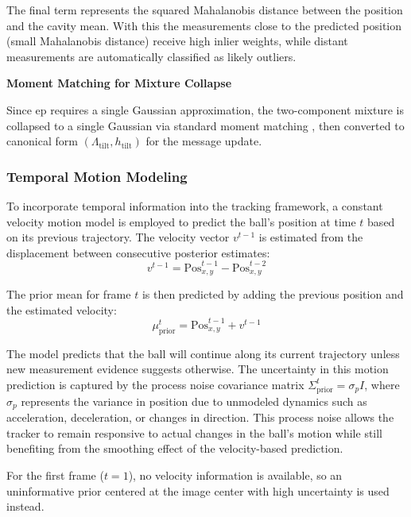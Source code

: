 \documentclass[12pt,a4paper]{article}
\begin{document}
The final term represents the squared Mahalanobis distance between the position and the cavity mean. With this the measurements close to the predicted position (small Mahalanobis distance) receive high inlier weights, while distant measurements are automatically classified as likely outliers.

\textbf{Moment Matching for Mixture Collapse}

Since \acs{ep} requires a single Gaussian approximation, the two-component mixture is collapsed to a single Gaussian via standard moment matching \parencite{minka2001expectation}, then converted to canonical form $(\Lambda_{\text{tilt}}, h_{\text{tilt}})$ for the message update.

\subsubsection{Temporal Motion Modeling}

To incorporate temporal information into the tracking framework, a constant velocity motion model is employed to predict the ball's position at time $t$ based on its previous trajectory. The velocity vector $v^{t-1}$ is estimated from the displacement between consecutive posterior estimates:
\begin{equation}
v^{t-1} = \text{Pos}_{x,y}^{t-1} - \text{Pos}_{x,y}^{t-2}
\end{equation}

The prior mean for frame $t$ is then predicted by adding the previous position and the estimated velocity:
\begin{equation}
\mu_{\text{prior}}^t = \text{Pos}_{x,y}^{t-1} + v^{t-1}
\end{equation}

The model predicts that the ball will continue along its current trajectory unless new measurement evidence suggests otherwise. The uncertainty in this motion prediction is captured by the process noise covariance matrix $\Sigma_{\text{prior}}^t = \sigma_p I$, where $\sigma_p$ represents the variance in position due to unmodeled dynamics such as acceleration, deceleration, or changes in direction. This process noise allows the tracker to remain responsive to actual changes in the ball's motion while still benefiting from the smoothing effect of the velocity-based prediction.

For the first frame ($t=1$), no velocity information is available, so an uninformative prior centered at the image center with high uncertainty is used instead.
\end{document}
